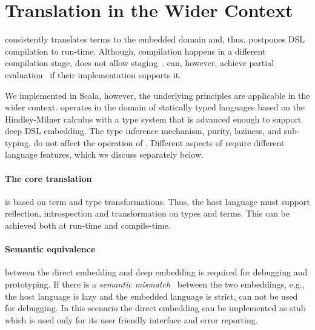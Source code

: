 \section{Translation in the Wider Context}
\label{sec:other-languages}


\yy consistently translates terms to the embedded domain and, thus, postpones
DSL compilation to run-time. Although, compilation happens in a different
compilation stage, \yy does not allow staging~\cite{taha_multi-stage_1997}.
\edsls can, however, achieve partial evaluation~\cite{jones1993partial} if their
implementation supports it.

We implemented \yy in Scala, however, the underlying principles are applicable
in the wider context. \yy operates in the domain of statically typed languages
based on the Hindley-Milner calculus with a type system that is advanced enough
to support deep DSL embedding. The type inference mechanism, purity, laziness,
and sub-typing, do not affect the operation of \yy. Different aspects of \yy
require different language features, which we discuss separately below.

\paragraph{The core translation} is based on term and
type transformations. Thus, the host language must support reflection,
introspection and transformation on types and terms. This can be achieved both
at run-time and compile-time.

\paragraph{Semantic equivalence} between the direct embedding and deep embedding
is required for debugging and prototyping. If there is a \emph{semantic mismatch}~\cite{czarnecki_dsl_2004}
 between the two embeddings, e.g., the host language is lazy and the embedded
 language is strict, \yy can not be used for debugging. In this scenario the
 direct embedding can be implemented as stub which is used only for its user
 friendly interface and error reporting.

